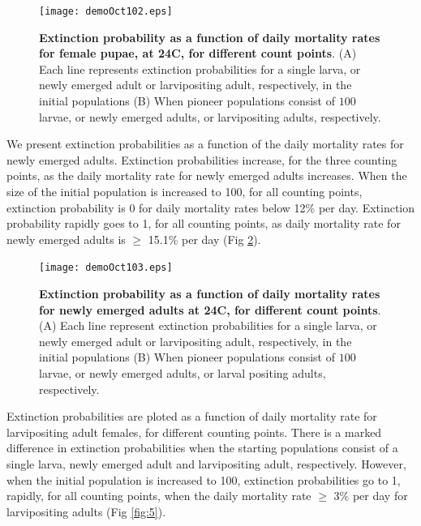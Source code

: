 \documentclass[smallextended]{svjour3}
\begin{document}
\begin{figure}[h]
	\texttt{[image: demoOct102.eps]}
		\caption{{\bf Extinction probability as a function of daily mortality rates for female pupae, at 24\degree C, for different count points}. (A) Each line represents extinction probabilities for a single larva, or newly emerged adult or larvipositing adult, respectively, in the initial populations (B) When pioneer populations consist of  $100$ larvae,  or newly emerged adults, or larvipositing adults, respectively.}
	\label{fig:3}       %
\end{figure}
%

We present extinction probabilities as a function of the daily mortality rates for newly emerged adults. Extinction probabilities increase, for the three counting points, as the daily mortality rate for newly emerged adults increases. When the size of the initial population is increased to 100, for all counting points, extinction probability is 0 for daily mortality rates below 12\% per day. Extinction probability rapidly goes to 1, for all counting points, as daily mortality rate for newly emerged adults is $\geq$ 15.1\% per day (Fig \ref{fig:4}).
   


\begin{figure}[h]
	\texttt{[image: demoOct103.eps]}
	\caption{{\bf Extinction probability as a function of daily mortality rates for newly emerged adults at 24\degree C, for different count points}. (A) Each line represent extinction probabilities for a single larva, or  newly emerged adult or larvipositing adult, respectively,  in the initial populations (B) When pioneer populations consist of  $100$ larvae,  or newly emerged adults, or larval positing adults, respectively.}
	\label{fig:4}       %
\end{figure}
%

\newpage

Extinction probabilities are ploted as a function of daily mortality rate for larvipositing adult females, for different counting points. There is a marked difference in extinction probabilities when the starting populations consist of a single larva, newly emerged adult and larvipositing adult, respectively. However, when the initial population is increased to 100, extinction probabilities go to 1, rapidly, for all counting points, when the daily mortality rate $\geq$ 3\% per day for larvipositing adults (Fig \ref{fig:5}). 
\end{document}
